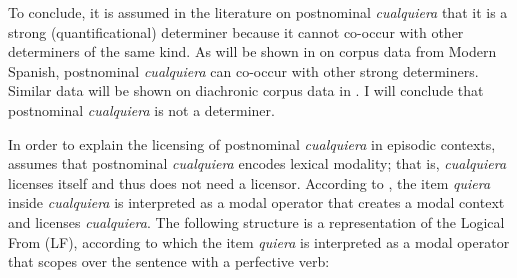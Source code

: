 \ea \label{bkm:Ref63458156} %
\z
\z


To conclude, it is assumed in the literature on postnominal \textit{cualquiera} that it is a strong (quantificational) determiner because it cannot co-occur with other determiners of the same kind. As will be shown in  on corpus data from Modern Spanish, postnominal \textit{cualquiera} can co-occur with other strong determiners. Similar data will be shown on diachronic corpus data in . I will conclude that postnominal \textit{cualquiera} is not a determiner.

In order to explain the licensing of postnominal \textit{cualquiera} in episodic contexts, \citet{Rivero2011} assumes that postnominal \textit{cualquiera} encodes lexical modality; that is, \textit{cualquiera} licenses itself and thus does not need a licensor. According to \citet{Rivero2011}, the item \textit{quiera} inside \textit{cualquiera} is interpreted as a modal operator that creates a modal context and licenses \textit{cualquiera}. The following structure is a representation of the Logical From (LF), according to which the item \textit{quiera} is interpreted as a modal operator that scopes over the sentence with a perfective verb:

